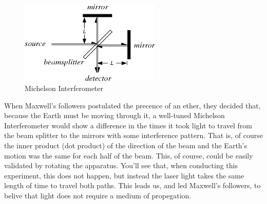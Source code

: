 \documentclass{amsart}
\begin{document}
%
\begin{figure}
    \centering
    \label{interferometer}
    \includegraphics[width=0.6\textwidth]{diagram.png}
    \caption{Michelson Interferometer}
\end{figure}

When Maxwell's followers postulated the precence of an ether, they decided that, because the Earth must be moving through it, a well-tuned Michelson Interferometer would show a difference in the times it took light to travel from the beam splitter to the mirrors with some interference pattern. That is, of course the inner product (dot product) of the direction of the beam and the Earth's motion was the same for each half of the beam. This, of course, could be easily validated by rotating the apparatus. You'll see that, when conducting this experiment, this does not happen, but instead the laser light takes the same length of time to travel both paths. This leads us, and led Maxwell's followers, to belive that light does not require a medium of propegation.
\end{document}
